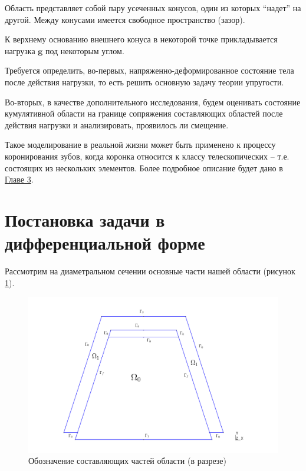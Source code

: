 \documentclass[a4paper, 14pt]{extreport}
\begin{document}
Область представляет собой пару усеченных конусов, один из которых
\enquote{надет} на другой. Между конусами имеется свободное пространство (зазор).

К верхнему основанию внешнего конуса в некоторой
точке прикладывается нагрузка $\textbf{g}$
под некоторым углом.

Требуется определить, во-первых, напряженно-деформированное состояние тела после действия нагрузки, то есть решить основную задачу теории упругости.

Во-вторых, в качестве дополнительного исследования, будем оценивать состояние кумулятивной области на границе сопряжения составляющих областей после действия нагрузки и анализировать, проявилось ли смещение.

Такое моделирование в реальной жизни может быть применено к
процессу коронирования зубов, когда коронка относится к 
классу телескопических -- т.е. состоящих из нескольких 
элементов. Более подробное описание будет дано в
 \hyperref[ch:exp]{Главе 3}.



\section{Постановка задачи в дифференциальной форме}

Рассмотрим на диаметральном сечении основные части нашей области 
(рисунок \ref{fig: marked_domain}).
\begin{figure}[H]
	\center
	\includegraphics[scale=0.4]{pictures/marked_domain.png}
	\caption{Обозначение составляющих частей области (в разрезе)}
	\label{fig: marked_domain}
\end{figure}
\end{document}
